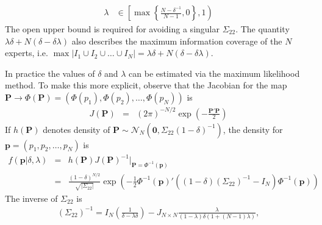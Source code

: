 \documentclass[11pt]{article}
\theoremstyle{definition}
\theoremstyle{definition}
\begin{document}
\begin{align}
\lambda &\in \left[  \max \left\{ \frac{N-\delta^{-1}}{N-1}, 0\right\}, 1 \right) \label{rhoDomain}
\end{align}
The open upper bound is required for avoiding a singular $\Sigma_{22}$. The quantity  $\lambda\delta + N(\delta - \delta\lambda)$ also describes the maximum information coverage of the $N$ experts, i.e. $\max | I_1 \cup I_2 \cup \dots \cup I_N| = \lambda\delta + N(\delta - \delta\lambda)$. 

In practice the values of $\delta$ and $\lambda$ can be estimated via the maximum likelihood method. To make this more explicit, observe that the Jacobian for the map $\boldsymbol{P} \to \Phi\left(\boldsymbol{P}\right) = (\Phi(p_1), \Phi(p_2), \dots, \Phi(p_N))$ is
\begin{eqnarray*}
J(\boldsymbol{P}) &=& (2\pi)^{-N/2} \exp \left( - \frac{\boldsymbol{P}' \boldsymbol{P}}{2}   \right) 
\end{eqnarray*}
%
If $h(\boldsymbol{P})$ denotes density of $\boldsymbol{P} \sim \mathcal{N}_N\left(\boldsymbol{0}, \Sigma_{22} (1-\delta)^{-1}\right)$,
the density for  $\boldsymbol{p} = (p_1, p_2, \dots, p_N)$ is 
\begin{eqnarray*}
 f\left(\boldsymbol{p} | \delta, \lambda \right) &=& h(\boldsymbol{P}) J(\boldsymbol{P})^{-1} \bigg|_{\boldsymbol{P} = \Phi^{-1}(\boldsymbol{p})}\\
&=& \frac{(1-\delta)^{N/2}}{\sqrt{ \left|\Sigma_{22}\right|}} \exp\left( -\frac{1}{2} \Phi^{-1}(\boldsymbol{p})' \left( (1-\delta) \left(\Sigma_{22}\right)^{-1} - I_N \right) \Phi^{-1}(\boldsymbol{p})  \right) 
\end{eqnarray*}
The inverse of $\Sigma_{22}$  is
\begin{align}
\left(\Sigma_{22}\right)^{-1} = I_N \left(\frac{1}{\delta-\lambda\delta} \right) - J_{N \times N} \frac{\lambda}{(1-\lambda)\delta(1+(N-1) \lambda)} \label{inverse},
\end{align}
\end{document}
